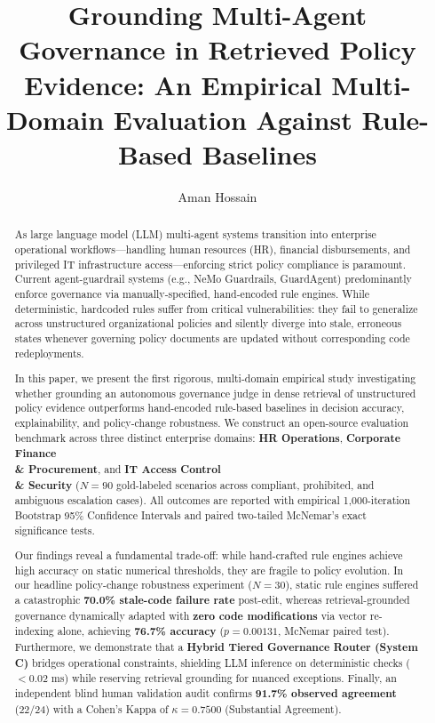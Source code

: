 \documentclass[sigconf,screen]{acmart}
\begin{document}
\title{Grounding Multi-Agent Governance in Retrieved Policy Evidence: An Empirical Multi-Domain Evaluation Against Rule-Based Baselines}

\author{Aman Hossain}

\begin{abstract}
As large language model (LLM) multi-agent systems transition into enterprise operational workflows---handling human resources (HR), financial disbursements, and privileged IT infrastructure access---enforcing strict policy compliance is paramount. Current agent-guardrail systems (e.g., NeMo Guardrails, GuardAgent) predominantly enforce governance via manually-specified, hand-encoded rule engines. While deterministic, hardcoded rules suffer from critical vulnerabilities: they fail to generalize across unstructured organizational policies and silently diverge into stale, erroneous states whenever governing policy documents are updated without corresponding code redeployments.

In this paper, we present the first rigorous, multi-domain empirical study investigating whether grounding an autonomous governance judge in dense retrieval of unstructured policy evidence outperforms hand-encoded rule-based baselines in decision accuracy, explainability, and policy-change robustness. We construct an open-source evaluation benchmark across three distinct enterprise domains: \textbf{HR Operations}, \textbf{Corporate Finance \\\& Procurement}, and \textbf{IT Access Control \\\& Security} ($N=90$ gold-labeled scenarios across compliant, prohibited, and ambiguous escalation cases). All outcomes are reported with empirical 1,000-iteration Bootstrap 95\% Confidence Intervals and paired two-tailed McNemar's exact significance tests. 

Our findings reveal a fundamental trade-off: while hand-crafted rule engines achieve high accuracy on static numerical thresholds, they are fragile to policy evolution. In our headline policy-change robustness experiment ($N=30$), static rule engines suffered a catastrophic \textbf{70.0\% stale-code failure rate} post-edit, whereas retrieval-grounded governance dynamically adapted with \textbf{zero code modifications} via vector re-indexing alone, achieving \textbf{76.7\% accuracy} ($p = 0.00131$, McNemar paired test). Furthermore, we demonstrate that a \textbf{Hybrid Tiered Governance Router (System C)} bridges operational constraints, shielding LLM inference on deterministic checks ($<0.02$ ms) while reserving retrieval grounding for nuanced exceptions. Finally, an independent blind human validation audit confirms \textbf{91.7\% observed agreement} (22/24) with a Cohen's Kappa of $\kappa = 0.7500$ (Substantial Agreement).
\end{abstract}
\end{document}
